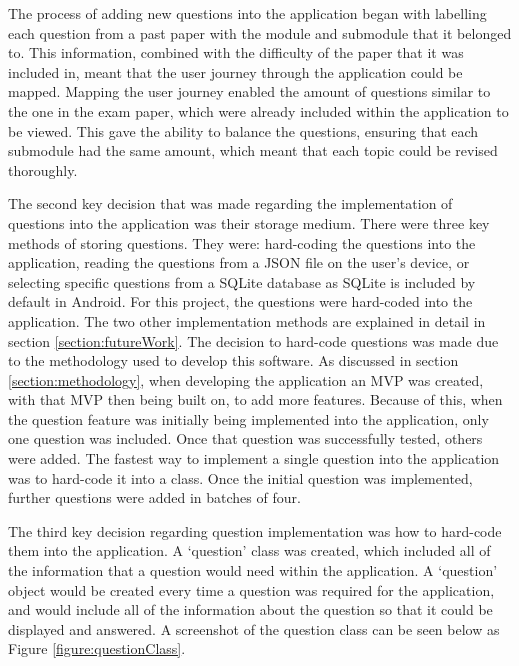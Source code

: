 \documentclass{article}
\begin{document}
The process of adding new questions into the application began with labelling each question from a past paper with the module and submodule that it belonged to. This information, combined with the difficulty of the paper that it was included in, meant that the user journey through the application could be mapped. Mapping the user journey enabled the amount of questions similar to the one in the exam paper, which were already included within the application to be viewed. This gave the ability to balance the questions, ensuring that each submodule had the same amount, which meant that each topic could be revised thoroughly. \par

The second key decision that was made regarding the implementation of questions into the application was their storage medium. There were three key methods of storing questions. They were: hard-coding the questions into the application, reading the questions from a JSON file on the user's device, or selecting specific questions from a SQLite database as SQLite is included by default in Android. For this project, the questions were hard-coded into the application. The two other implementation methods are explained in detail in section \ref{section:futureWork}. The decision to hard-code questions was made due to the methodology used to develop this software. As discussed in section \ref{section:methodology}, when developing the application an MVP was created, with that MVP then being built on, to add more features. Because of this, when the question feature was initially being implemented into the application, only one question was included. Once that question was successfully tested, others were added. The fastest way to implement a single question into the application was to hard-code it into a class. Once the initial question was implemented, further questions were added in batches of four. \par

The third key decision regarding question implementation was how to hard-code them into the application. A `question' class was created, which included all of the information that a question would need within the application. A `question' object would be created every time a question was required for the application, and would include all of the information about the question so that it could be displayed and answered. A screenshot of the question class can be seen below as Figure \ref{figure:questionClass}. 
\end{document}
